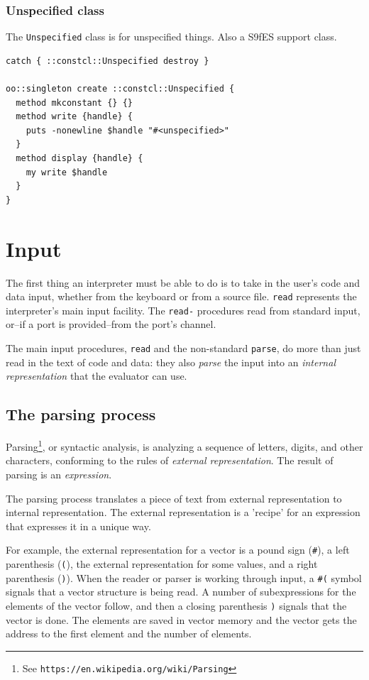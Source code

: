 \documentclass[twoside,9pt]{report}
\begin{document}
\subsection{Unspecified class}
\label{unspecified-class}


The \texttt{Unspecified} class is for unspecified things. Also a S9fES support class.

\begin{lstlisting}
catch { ::constcl::Unspecified destroy }

oo::singleton create ::constcl::Unspecified {
  method mkconstant {} {}
  method write {handle} {
    puts -nonewline $handle "#<unspecified>"
  }
  method display {handle} {
    my write $handle
  }
}
\end{lstlisting}
\chapter{Input}
\label{input}


The first thing an interpreter must be able to do is to take in the user's code and data input, whether from the keyboard or from a source file. \texttt{read} represents the interpreter's main input facility. The \texttt{read-} procedures read from standard input, or--if a port is provided--from the port's channel.


The main input procedures, \texttt{read} and the non-standard \texttt{parse}, do more than just read in the text of code and data: they also \emph{parse} the input into an \emph{internal representation} that the evaluator can use.

\section{The parsing process}
\label{the-parsing-process}


Parsing\footnote{See \texttt{https://en.wikipedia.org/wiki/Parsing}}, or syntactic analysis, is analyzing a sequence of letters, digits, and other characters, conforming to the rules of \emph{external representation}. The result of parsing is an \emph{expression}.


The parsing process translates a piece of text from external representation to internal representation. The external representation is a 'recipe' for an expression that expresses it in a unique way.


For example, the external representation for a vector is a pound sign (\texttt{\#}), a left parenthesis (\texttt{(}), the external representation for some values, and a right parenthesis (\texttt{)}). When the reader or parser is working through input, a \texttt{\#(} symbol signals that a vector structure is being read. A number of subexpressions for the elements of the vector follow, and then a closing parenthesis \texttt{)} signals that the vector is done. The elements are saved in vector memory and the vector gets the address to the first element and the number of elements.
\end{document}
